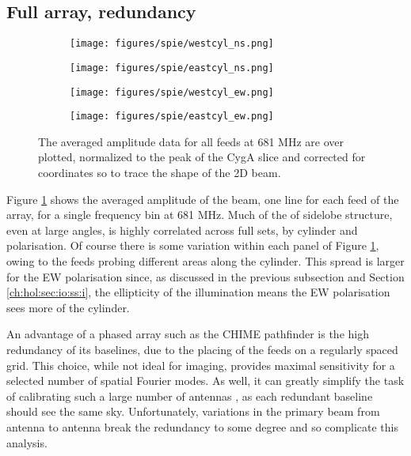 \subsection{Full array, redundancy} \label{ch:hol:sec:results:ss:fullarray}

\begin{figure}[h!] %
	\centering
	\begin{subfigure}[b]{0.49\textwidth}
		\texttt{[image: figures/spie/westcyl\_ns.png]}%
	\end{subfigure}
	\begin{subfigure}[b]{0.465\textwidth}
		\texttt{[image: figures/spie/eastcyl\_ns.png]}%
	\end{subfigure}
	\begin{subfigure}[b]{0.49\textwidth}
		\texttt{[image: figures/spie/westcyl\_ew.png]}%
	\end{subfigure}
	\begin{subfigure}[b]{0.46\textwidth}
		\texttt{[image: figures/spie/eastcyl\_ew.png]}%
	\end{subfigure}
\caption{The averaged amplitude data for all feeds at 681 MHz are over plotted, normalized to the peak of the CygA slice and corrected for coordinates so to trace the shape of the 2D beam. }
\label{allfeeds}
\end{figure}

Figure \ref{allfeeds} shows the averaged amplitude of the beam, one line for each feed of the array, for a single frequency bin at 681 MHz. Much of the of sidelobe structure, even at large angles, is highly correlated across full sets, by cylinder and polarisation. Of course there is some variation within each panel of Figure \ref{allfeeds}, owing to the feeds probing different areas along the cylinder. This spread is larger for the EW polarisation since, as discussed in the previous subsection and Section \ref{ch:hol:sec:io:ss:i}, the ellipticity of the illumination means the EW polarisation sees more of the cylinder.

An advantage of a phased array such as the CHIME pathfinder is the high redundancy of its baselines, due to the placing of the feeds on a regularly spaced grid. This choice, while not ideal for imaging, provides maximal sensitivity for a selected number of spatial Fourier modes. As well, it can greatly simplify the task of calibrating such a large number of antennas \citep{redundantbaselines}, as each redundant baseline should see the same sky. Unfortunately, variations in the primary beam from antenna to antenna break the redundancy to some degree and so complicate this analysis.

